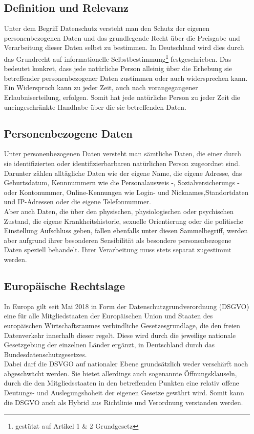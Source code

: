 \subsection{Definition und Relevanz}
Unter dem Begriff Datenschutz versteht man den Schutz der eigenen personenbezogenen Daten und das grundlegende Recht über die Preisgabe und Verarbeitung dieser Daten selbst zu bestimmen. In Deutschland wird dies durch das Grundrecht auf informationelle Selbstbestimmung\footnote{gestützt auf Artikel 1 \& 2 Grundgesetz} festgeschrieben. Das bedeutet konkret, dass jede natürliche Person alleinig über die Erhebung sie betreffender personenbezogener Daten zustimmen oder auch widersprechen kann. Ein Widerspruch kann zu jeder Zeit, auch nach vorangegangener Erlaubniserteilung, erfolgen. Somit hat jede natürliche Person zu jeder Zeit die uneingeschränkte Handhabe über die sie betreffenden Daten.

\subsection{Personenbezogene Daten}
    Unter personenbezogenen Daten versteht man sämtliche Daten, die einer durch sie identifizierten oder identifizierbarbaren natürlichen Person zugeordnet sind. Darunter zählen alltägliche Daten wie der eigene Name, die eigene Adresse, das Geburtsdatum, Kennnummern wie die Personalausweis -, Sozialversicherungs - oder Kontonummer, Online-Kennungen wie Login- und Nicknames,Standortdaten und IP-Adressen oder die eigene Telefonnummer.\\
    Aber auch Daten, die über den physischen, physiologischen oder psychischen Zustand, die eigene Krankheitshistorie, sexuelle Orientierung oder die politische Einstellung Aufschluss geben, fallen ebenfalls unter diesen Sammelbegriff, werden aber aufgrund ihrer besonderen Sensibilität als \glqq besondere personenbezogene Daten\grqq{} speziell behandelt. Ihrer Verarbeitung muss stets separat zugestimmt werden.

\subsection{Europäische Rechtslage}
    In Europa gilt seit Mai 2018 in Form der \glqq Datenschutzgrundverordnung\grqq{} (DSGVO) eine für alle Mitgliedstaaten der Europäischen Union und Staaten des europäischen Wirtschaftsraumes verbindliche Gesetzesgrundlage, die den freien Datenverkehr innerhalb dieser regelt. Diese wird durch die jeweilige nationale Gesetzgebung der einzelnen Länder ergänzt, in Deutschland durch das Bundesdatenschutzgesetzes.\\
    Dabei darf die DSVGO auf nationaler Ebene grundsätzlich weder verschärft noch abgeschwächt werden. Sie bietet allerdings auch sogenannte Öffnungsklauseln, durch die den Mitgliedsstaaten in den betreffenden Punkten eine relativ offene Deutungs- und Auslegungshoheit der eigenen Gesetze gewährt wird. Somit kann die DSGVO auch als Hybrid aus Richtlinie und Verordnung verstanden werden.\\

